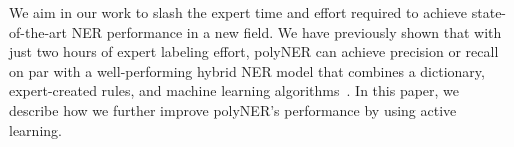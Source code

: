 We aim in our work to slash the expert time and effort required to achieve state-of-the-art NER performance
in a new field.
We have previously shown that with just two hours of expert labeling effort, 
polyNER can achieve %
precision or recall on par with a well-performing hybrid NER model
that combines a dictionary, expert-created rules, and machine learning algorithms~\cite{tchoua2019polyner}. 
In this paper, we describe how we further improve polyNER's performance by using active learning.
